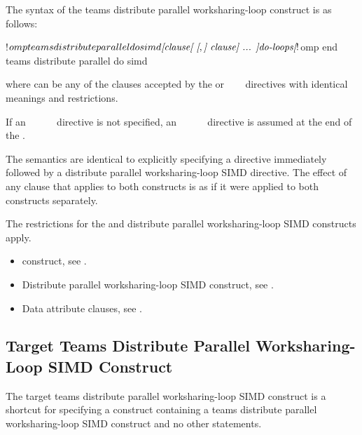 \begin{fortranspecific}
The syntax of the teams distribute parallel worksharing-loop construct is as follows:

\begin{ompfPragma}
!$omp teams distribute parallel do simd \plc{[clause[ [},\plc{] clause] ... ]}
    \plc{do-loops}
\plc{[}!$omp end teams distribute parallel do simd\plc{]}
\end{ompfPragma}

where  can be any of the clauses accepted by the  or
~~~
directives with identical meanings and restrictions.

If an ~~~~~ directive is not specified, an
~~~~~ directive is assumed at the end of
the .
\end{fortranspecific}

\descr
The semantics are identical to explicitly specifying a  directive immediately
followed by a distribute parallel worksharing-loop SIMD directive. The effect of any clause that
applies to both constructs is as if it were applied to both constructs separately.

\restrictions
The restrictions for the  and distribute parallel worksharing-loop
SIMD constructs apply.

\crossreferences
\begin{itemize}
\item {} construct, see
.

\item Distribute parallel worksharing-loop SIMD construct, see
.

\item Data attribute clauses, see
.
\end{itemize}










\subsection{Target Teams Distribute Parallel Worksharing-Loop SIMD Construct}
\label{subsec:Target Teams Distribute Parallel Loop SIMD Construct}
\summary
The target teams distribute parallel worksharing-loop SIMD construct is a shortcut for specifying a 
construct containing a teams distribute parallel worksharing-loop SIMD construct and no other statements.

